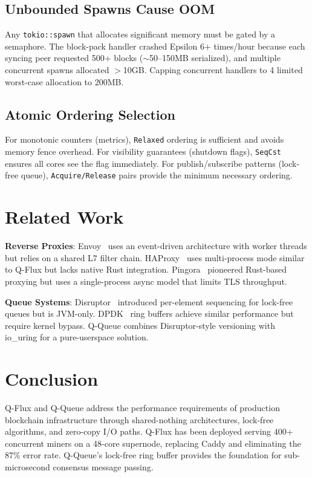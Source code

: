 \documentclass[11pt,a4paper,twocolumn]{article}
\begin{document}
\subsection{Unbounded Spawns Cause OOM}

Any \texttt{tokio::spawn} that allocates significant memory must be gated by a semaphore. The block-pack handler crashed Epsilon 6+ times/hour because each syncing peer requested 500+ blocks ($\sim$50--150MB serialized), and multiple concurrent spawns allocated $>$10GB. Capping concurrent handlers to 4 limited worst-case allocation to 200MB.

\subsection{Atomic Ordering Selection}

For monotonic counters (metrics), \texttt{Relaxed} ordering is sufficient and avoids memory fence overhead. For visibility guarantees (shutdown flags), \texttt{SeqCst} ensures all cores see the flag immediately. For publish/subscribe patterns (lock-free queue), \texttt{Acquire/Release} pairs provide the minimum necessary ordering.

\section{Related Work}

\textbf{Reverse Proxies}: Envoy~\cite{envoy} uses an event-driven architecture with worker threads but relies on a shared L7 filter chain. HAProxy~\cite{haproxy} uses multi-process mode similar to Q-Flux but lacks native Rust integration. Pingora~\cite{pingora} pioneered Rust-based proxying but uses a single-process async model that limits TLS throughput.

\textbf{Queue Systems}: Disruptor~\cite{disruptor} introduced per-element sequencing for lock-free queues but is JVM-only. DPDK~\cite{dpdk} ring buffers achieve similar performance but require kernel bypass. Q-Queue combines Disruptor-style versioning with io\_uring for a pure-userspace solution.

\section{Conclusion}

Q-Flux and Q-Queue address the performance requirements of production blockchain infrastructure through shared-nothing architectures, lock-free algorithms, and zero-copy I/O paths. Q-Flux has been deployed serving 400+ concurrent miners on a 48-core supernode, replacing Caddy and eliminating the 87\% error rate. Q-Queue's lock-free ring buffer provides the foundation for sub-microsecond consensus message passing.
\end{document}
